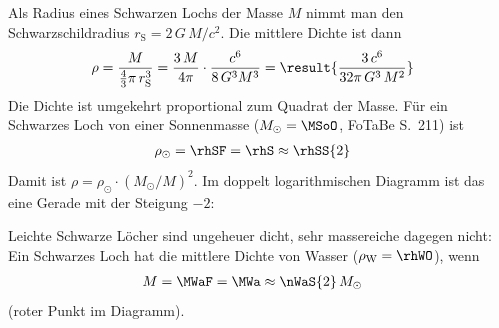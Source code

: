 Als Radius eines Schwarzen Lochs der Masse $M$ nimmt man den Schwarzschildradius $r_\mathrm{S} = 2\,G\,M/c^2$. Die mittlere Dichte ist dann
\begin{align}
 \rho &= \frac{M}{\frac{4}{3}\pi\,r_\mathrm{S}^3}
   = \frac{3\,M}{4\pi}\cdot\frac{c^6}{8\,G^3 M^3}
   = \result{\frac{3\,c^6}{32\pi\,G^3\,M^2}}
\end{align}
Die Dichte ist umgekehrt proportional zum Quadrat der Masse. Für ein Schwarzes Loch von einer Sonnenmasse ($M_\odot = \MSoO$, FoTaBe S.~211) ist
\begin{align}
 \rho_\odot &= \rhSF = \rhS \approx \rhSS{2}
\end{align}
Damit ist $\rho = \rho_\odot\cdot\left(M_\odot/M\right)^2$. Im doppelt logarithmischen Diagramm ist das eine Gerade mit der Steigung $-2$:

\begin{center}
\end{center}

Leichte Schwarze Löcher sind ungeheuer dicht, sehr massereiche dagegen nicht: Ein Schwarzes Loch hat die mittlere Dichte von Wasser ($\rho_\mathrm{W} = \rhWO$), wenn
\begin{align}
 M &= \MWaF = \MWa \approx \nWaS{2}\,M_\odot
\end{align}
(roter Punkt im Diagramm).
